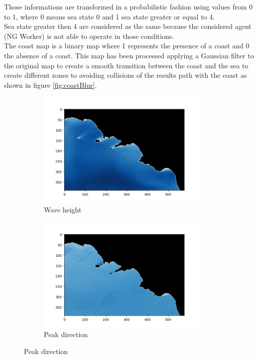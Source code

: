 \documentclass[journal,article,submit,pdftex,moreauthors]{Definitions/mdpi}
\begin{document}
Those informations are transformed in a probabilistic fashion using values from 0 to 1, where 0 means sea state 0 and 1 sea state greater or equal to 4.\\
Sea state greater then 4 are considered as the same because the considered agent (NG Worker) is not able to operate in those conditions.\\

The coast map is a binary map where 1 represents the presence of a coast and 0 the absence of a coast. This map has been processed applying a Gaussian filter to the original map 
to create a smooth transition between the coast and the sea to create different zones to avoiding collisions of the results path with the coast as shown in figure \ref*{fig:coastBlur}.\\
\begin{figure}[h]
	\begin{subfigure}{0.5\textwidth}
		\centering
		\includegraphics[width=\textwidth]{res/imgs/waveHeight.png}
		\caption{Wave height}
		\label{fig:waveHeight}
	\end{subfigure}
	\begin{subfigure}{0.5\textwidth}
		\centering
		\includegraphics[width=\textwidth]{res/imgs/peakDir.png}
		\caption{Peak direction}
		\label{fig:pDir}
	\end{subfigure}
\end{figure}
\end{document}
